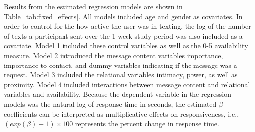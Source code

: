 \documentclass[12pt]{nuthesis}	%
\begin{document}
Results from the estimated regression models are shown in Table~\ref{tab:fixed_effects}. All models included age and gender as covariates. In order to control for the how active the user was in texting, the log of the number of texts a participant sent over the 1 week study period was also included as a covariate. Model 1 included these control variables as well as the 0-5 availability measure. Model 2 introduced the message content variables importance, importance to contact, and dummy variables indicating if the message was a request. Model 3 included the relational variables intimacy, power, as well as proximity. Model 4 included interactions between message content and relational variables and availability. Because the dependent variable in the regression models was the natural log of response time in seconds, the estimated $\beta$ coefficients can be interpreted as multiplicative effects on responsiveness, i.e., $(exp(\beta) - 1) \times 100 $ represents the percent change in response time.
\end{document}
